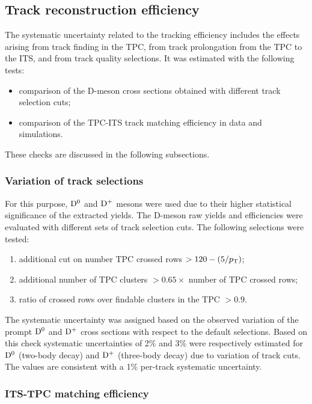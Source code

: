 \subsection{Track reconstruction efficiency}
\label{sec:TrackEffSystPP}
The systematic uncertainty related to the tracking efficiency includes the 
effects arising from track finding in the TPC, from track prolongation  
from the TPC to the ITS, and from track quality selections.
It was estimated with the following tests:
\begin{itemize}
\item comparison of the D-meson cross sections obtained with different track selection cuts;
\item comparison of the TPC-ITS track matching efficiency in data and simulations.
\end{itemize}
These checks are discussed in the following subsections.

\subsubsection{Variation of track selections}
For this purpose, ${\rm D^0}$ and ${\rm D^+}$ mesons were used due to their
higher statistical significance of the extracted yields.
The D-meson raw yields and efficiencies were evaluated with 
different sets of track selection cuts.
The following selections were tested:
\begin{enumerate}
\item additional cut on number TPC crossed rows $> 120-(5/p_{\rm T})$;
\item additional number of TPC clusters $>0.65 \times$ number of TPC crossed rows;
\item ratio of crossed rows over findable clusters in the TPC $>0.9$.
\end{enumerate}
The systematic uncertainty was assigned based on the observed variation of
the prompt ${\rm D^0}$ and ${\rm D^+}$ cross sections with respect to the default selections.
Based on this check systematic uncertainties of 2\% and 3\% were 
respectively estimated for ${\rm D^0}$ (two-body decay) and ${\rm D^+}$ (three-body decay) 
due to variation of track cuts. The values are consistent with a 1\% per-track systematic
uncertainty.

\subsubsection{ITS-TPC matching efficiency}

